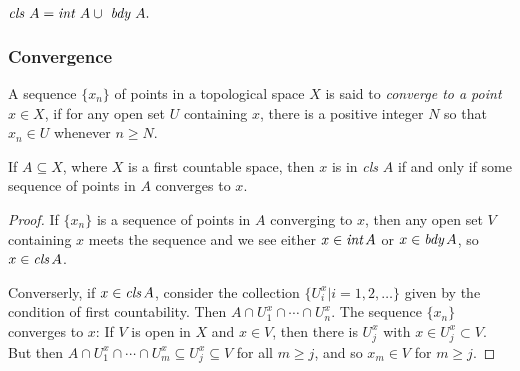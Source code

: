 \begin{proposition}
$\emph{cls } A = \emph{int } A \cup \emph{ bdy } A.$
\end{proposition}

\subsubsection{Convergence}\label{convergence}
A sequence $\{ x_n \}$ of points in a topological space $X$ is said to \emph{converge to a point} $x \in X$,
if for any open set $U$ containing $x$, there is a positive integer $N$ so that $x_n \in U$ whenever $n \geq N$.

\begin{proposition}
If $A \subseteq X$, where $X$ is a first countable space, then $x$ is in \emph{cls} $A$ if and only if some sequence of points in $A$ converges to $x$.
\end{proposition}

\begin{proof}
If $\{ x_n \}$ is a sequence of points in $A$ converging to $x$, then any open set $V$ containing $x$ meets the sequence and we see either $x \in \emph{int} \, A$ or $x \in \emph{bdy} \, A$, so
$x \in \emph{cls} \, A$.

Converserly, if $x \in \emph{cls} \, A$, consider the collection $\{ U^x_i | i = 1,2,\dots \}$ given by the condition of first countability. Then $A \cap U^x_1 \cap \cdots \cap U^x_n.$ The sequence $\{ x_n \}$
converges to $x$: If $V$ is open in $X$ and $x \in V$, then there is $U^x_j$ with $x \in U^x_j \subset V$. But then $A \cap U^x_1 \cap \cdots \cap U^x_m \subseteq U^x_j \subseteq V$ for all $m \geq j$, and so $x_m \in V$
for $m \geq j$.
\end{proof}